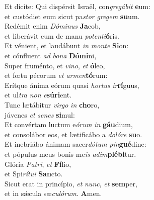 \evenverse Et dícite: Qui dispérsit Israël, con\textit{gre}\textit{gá}\textit{bit} \textbf{e}um:~\*\\
\evenverse et custódiet eum sicut pa\textit{stor} \textit{gre}\textit{gem} \textbf{su}um.\\
\oddverse Redémit enim \textit{Dó}\textit{mi}\textit{nus} \textbf{Ja}cob,~\*\\
\oddverse et liberávit eum de manu \textit{po}\textit{ten}\textit{ti}\textbf{ó}ris.\\
\evenverse Et vénient, et laudábunt \textit{in} \textit{mon}\textit{te} \textbf{Si}on:~\*\\
\evenverse et cónfluent \textit{ad} \textit{bo}\textit{na} \textbf{Dó}\textbf{mi}ni,\\
\oddverse Super fruménto, et \textit{vi}\textit{no}, \textit{et} \textbf{ó}leo,~\*\\
\oddverse et fœtu pécorum \textit{et} \textit{ar}\textit{men}\textbf{tó}rum:\\
\evenverse Erítque ánima eórum quasi \textit{hor}\textit{tus} \textit{ir}\textbf{rí}guus,~\*\\
\evenverse et ul\textit{tra} \textit{non} \textit{e}\textbf{sú}\textbf{ri}ent.\\
\oddverse Tunc lætábitur \textit{vir}\textit{go} \textit{in} \textbf{cho}ro,~\*\\
\oddverse júvenes \textit{et} \textit{se}\textit{nes} \textbf{si}mul:\\
\evenverse Et convértam luctum e\textit{ó}\textit{rum} \textit{in} \textbf{gáu}dium,~\*\\
\evenverse et consolábor eos, et lætificábo a \textit{do}\textit{ló}\textit{re} \textbf{su}o.\\
\oddverse Et inebriábo ánimam sacer\textit{dó}\textit{tum} \textit{pin}\textbf{gué}dine:~\*\\
\oddverse et pópulus meus bonis me\textit{is} \textit{a}\textit{dim}\textbf{plé}\textbf{bi}tur.\\
\evenverse Glória \textit{Pa}\textit{tri}, \textit{et} \textbf{Fí}lio,~\*\\
\evenverse et Spi\textit{rí}\textit{tu}\textit{i} \textbf{San}cto.\\
\oddverse Sicut erat in princípio, \textit{et} \textit{nunc}, \textit{et} \textbf{sem}per,~\*\\
\oddverse et in sǽcula sæ\textit{cu}\textit{ló}\textit{rum}. \textbf{A}men.\\
